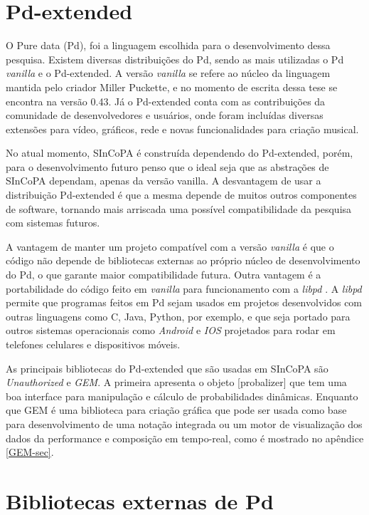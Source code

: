 \documentclass{ppgmus}
\begin{document}
\section{Pd-extended}

O Pure data (Pd), foi a linguagem escolhida para o desenvolvimento dessa pesquisa.
Existem diversas distribuições do Pd, sendo as mais utilizadas o Pd \textit{vanilla} e o Pd-extended.
A versão \textit{vanilla} se refere ao núcleo da linguagem mantida pelo criador Miller Puckette, e no
momento de escrita dessa tese se encontra na versão 0.43. Já o Pd-extended conta com as contribuições
da comunidade de desenvolvedores e usuários, onde foram incluídas diversas extensões para vídeo, gráficos, rede e
novas funcionalidades para criação musical.

No atual momento, SInCoPA é construída dependendo do Pd-extended, porém, para o desenvolvimento futuro penso
que o ideal seja que as abstrações de SInCoPA dependam, apenas da versão vanilla. A desvantagem de usar a distribuição Pd-extended é 
que a mesma depende de muitos outros componentes de software, tornando mais arriscada uma possível 
compatibilidade da pesquisa com sistemas futuros.

A vantagem de manter um projeto compatível com a versão \textit{vanilla} é que
o código não depende de bibliotecas externas ao próprio núcleo de desenvolvimento
do Pd, o que garante maior compatibilidade futura. Outra vantagem é a portabilidade do código 
feito em \textit{vanilla} para funcionamento
com a \textit{libpd} \cite{libpd}. A \textit{libpd} permite que
programas feitos em Pd sejam usados em projetos desenvolvidos com outras linguagens como
C, Java, Python, por exemplo, e que seja portado para outros sistemas operacionais como
\textit{Android} e \textit{IOS} projetados para rodar em telefones celulares e dispositivos móveis.
 
As principais  bibliotecas do Pd-extended que são usadas em SInCoPA são \textit{Unauthorized} e 
\textit{GEM}. A primeira apresenta o objeto [probalizer] que tem uma boa interface para manipulação
e cálculo de probabilidades dinâmicas. Enquanto que GEM é uma biblioteca para criação gráfica
que pode ser usada como base para desenvolvimento de uma notação integrada ou um motor de
visualização dos dados da performance e composição em tempo-real, como é mostrado no apêndice \ref{GEM-sec}.

\section{Bibliotecas externas de Pd}
\end{document}
